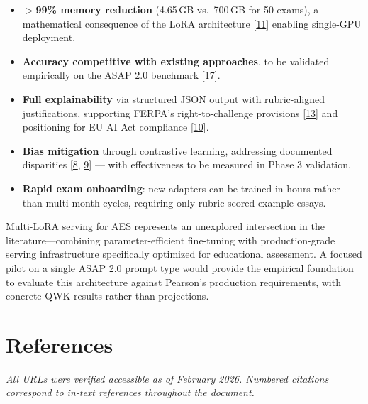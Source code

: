 \documentclass[12pt]{article}
\begin{document}
\begin{itemize}[leftmargin=*]
    \item \textbf{$>$99\% memory reduction} (4.65\,GB vs.\ 700\,GB for 50 exams), a mathematical consequence of the LoRA architecture [\hyperlink{ref11}{11}] enabling single-GPU deployment.
    \item \textbf{Accuracy competitive with existing approaches}, to be validated empirically on the ASAP 2.0 benchmark [\hyperlink{ref17}{17}].
    \item \textbf{Full explainability} via structured JSON output with rubric-aligned justifications, supporting FERPA's right-to-challenge provisions [\hyperlink{ref13}{13}] and positioning for EU AI Act compliance [\hyperlink{ref10}{10}].
    \item \textbf{Bias mitigation} through contrastive learning, addressing documented disparities [\hyperlink{ref8}{8}, \hyperlink{ref9}{9}] --- with effectiveness to be measured in Phase 3 validation.
    \item \textbf{Rapid exam onboarding}: new adapters can be trained in hours rather than multi-month cycles, requiring only rubric-scored example essays.
\end{itemize}

\begin{keyinsight}
\singlespacing
Multi-LoRA serving for AES represents an unexplored intersection in the literature---combining parameter-efficient fine-tuning with production-grade serving infrastructure specifically optimized for educational assessment. A focused pilot on a single ASAP 2.0 prompt type would provide the empirical foundation to evaluate this architecture against Pearson's production requirements, with concrete QWK results rather than projections.
\end{keyinsight}

\newpage
\section*{References}

\vspace{4pt}
{\small\textit{All URLs were verified accessible as of February 2026. Numbered citations correspond to in-text references throughout the document.}}
\vspace{8pt}
\end{document}
